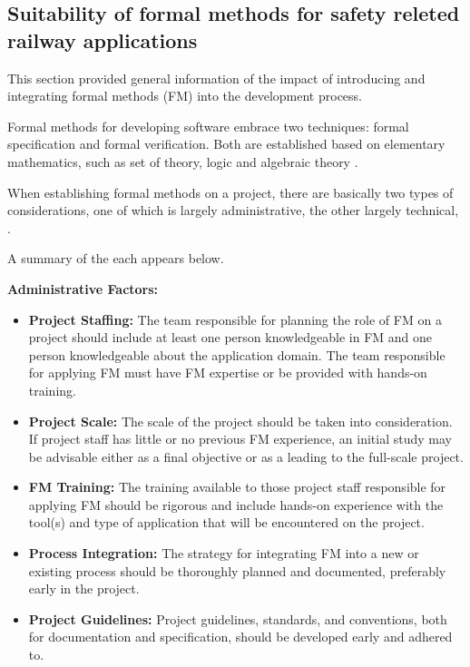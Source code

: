 \documentclass{template/openetcs_report}
\begin{document}
\subsection{Suitability of formal methods for safety releted railway applications}
This section provided general information of the impact of introducing and integrating formal methods (FM) into the development process.

Formal methods for developing software embrace two techniques: formal specification and formal verification. Both are established based on elementary mathematics, such as set of theory, logic and algebraic theory \cite{SOFL-doc}.

When establishing formal methods on a project, there are basically two types of considerations, one of which is largely administrative, the other largely technical, \cite{FM-doc}. 

A summary of the each appears below.

\textbf{Administrative Factors:}
\begin{itemize}\itemsep=0pt
  \item \textbf{Project Staffing:} The team responsible for planning the role of FM on a project should include at least one person knowledgeable in FM and one person knowledgeable about the application domain. The team responsible for applying FM must have FM expertise or be provided with hands-on training.
  \item \textbf{Project Scale:} The scale of the project should be taken into consideration. If project staff has little or no previous FM experience, an initial study may be advisable either as a final objective or as a leading to the full-scale project.
  \item \textbf{FM Training:} The training available to those project staff responsible for applying FM should be rigorous and include hands-on experience with the tool(s) and type of application that will be encountered on the project.
  \item \textbf{Process Integration:} The strategy for integrating FM into a new or existing process should be thoroughly planned and documented, preferably early in the project.
  \item \textbf{Project Guidelines:} Project guidelines, standards, and conventions, both for documentation and specification, should be developed early and adhered to.
\end{itemize}
\end{document}
